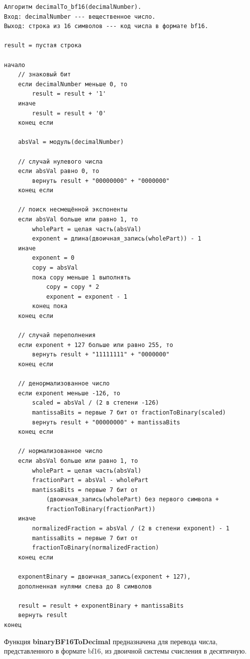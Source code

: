 \begin{verbatim}
Алгоритм decimalTo_bf16(decimalNumber).
Вход: decimalNumber --- вещественное число.
Выход: строка из 16 символов --- код числа в формате bf16.

result = пустая строка

начало
    // знаковый бит
    если decimalNumber меньше 0, то
        result = result + '1'
    иначе
        result = result + '0'
    конец если

    absVal = модуль(decimalNumber)

    // случай нулевого числа
    если absVal равно 0, то
        вернуть result + "00000000" + "0000000"
    конец если

    // поиск несмещённой экспоненты
    если absVal больше или равно 1, то
        wholePart = целая часть(absVal)
        exponent = длина(двоичная_запись(wholePart)) - 1
    иначе
        exponent = 0
        copy = absVal
        пока copy меньше 1 выполнять
            copy = copy * 2
            exponent = exponent - 1
        конец пока
    конец если

    // случай переполнения
    если exponent + 127 больше или равно 255, то
        вернуть result + "11111111" + "0000000"
    конец если

    // денормализованное число
    если exponent меньше -126, то
        scaled = absVal / (2 в степени -126)
        mantissaBits = первые 7 бит от fractionToBinary(scaled)
        вернуть result + "00000000" + mantissaBits
    конец если

    // нормализованное число
    если absVal больше или равно 1, то
        wholePart = целая часть(absVal)
        fractionPart = absVal - wholePart
        mantissaBits = первые 7 бит от
            (двоичная_запись(wholePart) без первого символа + 
            fractionToBinary(fractionPart))
    иначе
        normalizedFraction = absVal / (2 в степени exponent) - 1
        mantissaBits = первые 7 бит от 
        fractionToBinary(normalizedFraction)
    конец если

    exponentBinary = двоичная_запись(exponent + 127),
    дополненная нулями слева до 8 символов

    result = result + exponentBinary + mantissaBits
    вернуть result
конец
\end{verbatim}

Функция \textbf{binaryBF16ToDecimal} предназначена для перевода числа,
представленного в формате bf16, из двоичной системы счисления в десятичную.

